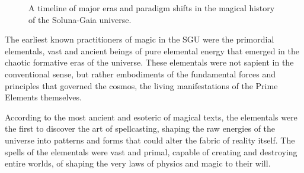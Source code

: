 \documentclass[12pt]{article}
\begin{document}
\begin{figure}[htb]
    \centering
    \caption{A timeline of major eras and paradigm shifts in the magical history of the Soluna-Gaia universe.}
    \label{fig:magic_history_timeline}
\end{figure}

The earliest known practitioners of magic in the SGU were the primordial elementals, vast and ancient beings of pure elemental energy that emerged in the chaotic formative eras of the universe. These elementals were not sapient in the conventional sense, but rather embodiments of the fundamental forces and principles that governed the cosmos, the living manifestations of the Prime Elements themselves.

According to the most ancient and esoteric of magical texts, the elementals were the first to discover the art of spellcasting, shaping the raw energies of the universe into patterns and forms that could alter the fabric of reality itself. The spells of the elementals were vast and primal, capable of creating and destroying entire worlds, of shaping the very laws of physics and magic to their will.
\end{document}
